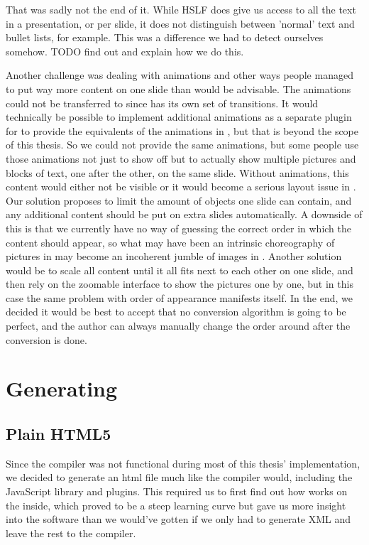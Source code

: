    That was sadly not the end of it. While HSLF does give us access to all the
   text in a presentation, or per slide, it does not distinguish between
   'normal' text and bullet lists, for example. This was a difference we had to
   detect ourselves somehow. TODO find out and explain how we do this.

   Another challenge was dealing with animations and other ways people managed
   to put way more content on one slide than would be advisable. The animations
   could not be transferred to \mxp since \mxp has its own set of transitions.
   It would technically be possible to implement additional animations as a
   separate plugin for \mxp to provide the equivalents of the animations in
   \ppt, but that is beyond the scope of this thesis. So we could not provide
   the same animations, but some people use those animations not just to show
   off but to actually show multiple pictures and blocks of text, one after the
   other, on the same slide. Without animations, this content would either not
   be visible or it would become a serious layout issue in \mxp. Our solution
   proposes to limit the amount of objects one slide can contain, and any
   additional content should be put on extra slides automatically. A downside
   of this is that we currently have no way of guessing the correct order in
   which the content should appear, so what may have been an intrinsic
   choreography of pictures in \ppt may become an incoherent jumble of images
   in \mxp. Another solution would be to scale all content until it all fits
   next to each other on one slide, and then rely on the zoomable interface to
   show the pictures one by one, but in this case the same problem with order
   of appearance manifests itself. In the end, we decided it would be best to
   accept that no conversion algorithm is going to be perfect, and the author
   can always manually change the order around after the conversion is done.

  \section{Generating \mxp}

   \subsection{Plain HTML5}

    Since the \mxp compiler was not functional during most of this thesis'
    implementation, we decided to generate an html file much like the \mxp
    compiler would, including the \mxp JavaScript library and plugins. This
    required us to first find out how \mxp works on the inside, which proved to
    be a steep learning curve but gave us more insight into the software than
    we would've gotten if we only had to generate \mxp XML and leave the rest
    to the compiler.

